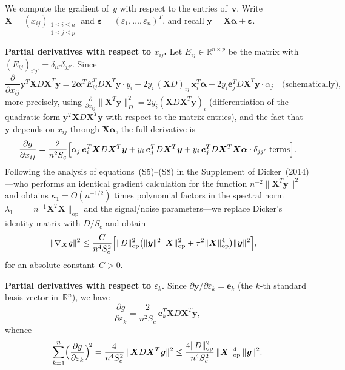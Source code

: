 \documentclass[11pt]{article}
\newcommand{\R}{\mathbb{R}}
\newcommand{\op}{\mathrm{op}}
\newcommand{\X}{\bm{X}}
\newcommand{\y}{\bm{y}}
\newcommand{\bal}{\bm{\alpha}}
\newcommand{\beps}{\bm{\varepsilon}}
\newcommand{\bx}{\bm{x}}
\newcommand{\be}{\bm{e}}
\newcommand{\bv}{\bm{v}}
\begin{document}
We compute the gradient of~$g$ with respect to the entries of~$\bv$.  Write
$\X=(x_{ij})_{\substack{1\le i\le n\\1\le j\le p}}$ and
$\beps=(\varepsilon_1,\dots,\varepsilon_n)^{T}$, and recall $\y=\X\bal+\beps$.

\medskip
\noindent\textbf{Partial derivatives with respect to $x_{ij}$.}\;
Let $E_{ij}\in\R^{n\times p}$ be the matrix with $(E_{ij})_{i'j'}=\delta_{ii'}\delta_{jj'}$.
Since
\begin{equation}\label{eq:partials_x1}
  \frac{\partial}{\partial x_{ij}}\y^{T}\X D\X^{T}\y
  = 2\bal^{T}E_{ij}^{T}D\X^{T}\y\cdot y_i
    + 2y_i\,(\X D)_{ij}\,\bx_i^{T}\bal
    + 2y_i\be_j^{T}D\X^{T}\y\cdot\alpha_j
    \quad\text{(schematically)},
\end{equation}
more precisely, using $\frac{\partial}{\partial x_{ij}}\|\X^{T}\y\|_{D}^{2}
= 2y_i(\X D\X^{T}\y)_i$ (differentiation of the quadratic form
$\y^{T}\X D\X^{T}\y$ with respect to the matrix entries), and the fact that
$\y$ depends on $x_{ij}$ through $\X\bal$, the full derivative is
\begin{equation}\label{eq:dg_dxij}
  \frac{\partial g}{\partial x_{ij}}
  = \frac{2}{n^{2}S_c}
    \Bigl[\alpha_j\,\be_i^{T}\X D\X^{T}\y
    + y_i\,\be_j^{T}D\X^{T}\y
    + y_i\,\be_j^{T}D\X^{T}\X\bal\cdot\delta_{jj'}\text{ terms}\Bigr].
\end{equation}
Following the analysis of equations~(S5)--(S8) in the Supplement of
Dicker~(2014)---who performs an identical gradient calculation for the
function $n^{-2}\|\X^{T}\y\|^{2}$ and obtains
$\kappa_1=O(n^{-1/2})$ times polynomial factors in the spectral norm
$\lambda_1=\|n^{-1}\X^{T}\X\|_{\op}$ and the signal/noise parameters---we
replace Dicker's identity matrix with $D/S_c$ and obtain
\begin{align}
  \|\nabla_{\X}g\|^{2}
  &\le \frac{C}{n^{4}S_c^{2}}
    \Bigl[\|D\|_{\op}^{2}\bigl(\|\y\|^{2}\|\X\|_{\op}^{2}
    + \tau^{2}\|\X\|_{\op}^{4}\bigr)
    \|\y\|^{2}\Bigr],
  \label{eq:gradX_bound}
\end{align}
for an absolute constant~$C>0$.

\medskip
\noindent\textbf{Partial derivatives with respect to $\varepsilon_k$.}\;
Since $\partial\y/\partial\varepsilon_k=\be_k$ (the $k$-th standard basis
vector in~$\R^n$), we have
\begin{equation}\label{eq:dg_deps}
  \frac{\partial g}{\partial\varepsilon_k}
  = \frac{2}{n^{2}S_c}\,\be_k^{T}\X D\X^{T}\y,
\end{equation}
whence
\begin{equation}\label{eq:gradeps_bound}
  \sum_{k=1}^{n}\Bigl(\frac{\partial g}{\partial\varepsilon_k}\Bigr)^{\!2}
  = \frac{4}{n^{4}S_c^{2}}\,\|\X D\X^{T}\y\|^{2}
  \le \frac{4\|D\|_{\op}^{2}}{n^{4}S_c^{2}}
    \,\|\X\|_{\op}^{4}\,\|\y\|^{2}.
\end{equation}
\end{document}
